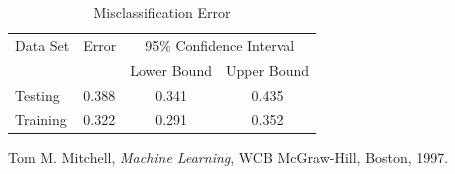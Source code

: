 \documentclass{article}
\begin{document}
\begin{table}
\caption{Misclassification Error}
\begin{center}
\begin{tabular}{llcc}
\toprule
Data Set & Error & \multicolumn{2}{c}{95\% Confidence Interval} \\
\cmidrule(r){3-4}
& & Lower Bound & Upper Bound \\
\midrule
Testing       & 0.388 &  0.341 & 0.435  \\
Training      & 0.322 &  0.291 & 0.352  \\
\bottomrule
\end{tabular}
\label{error}
\end{center}
\end{table}

\begin{thebibliography}{9}

  Tom M. Mitchell,
  \emph{Machine Learning},
  WCB McGraw-Hill, Boston,
  1997.

\end{thebibliography}
\end{document}
